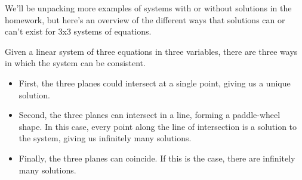 \documentclass{ximera}
\begin{document}
\begin{exploration}

We'll be unpacking more examples of systems with or without solutions in the homework, but here's an overview of the different ways that solutions can or can't exist for 3x3 systems of equations.

Given a linear system of three equations in three variables, there are three ways in which the system can be consistent.

\begin{itemize}
    \item First, the three planes could intersect at a single point, giving us a unique solution.
    \begin{center}
        \end{center}
    \item Second, the three planes can intersect in a line, forming a paddle-wheel shape.  In this case, every point along the line of intersection is a solution to the system, giving us infinitely many solutions.
        \begin{center}
            \end{center}
    \item Finally, the three planes can coincide.  If this is the case, there are infinitely many solutions.
        \begin{center}
        \end{center}
\end{itemize}


\end{exploration}
\end{document}
